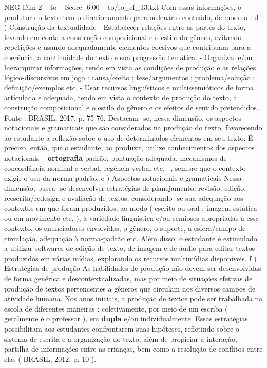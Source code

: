 \begin{textsample}{NEG Dim 2 – to – Score -6.00 – to/to\_ef\_13.txt}
Com essas informações, o produtor do texto tem o direcionamento para ordenar o conteúdo, de modo a : d ) Construção da textualidade - Estabelecer relações entre as partes do texto, levando em conta a construção composicional e o estilo do gênero, evitando repetições e usando adequadamente elementos coesivos que contribuam para a coerência, a continuidade do texto e sua progressão temática. - Organizar e/ou hierarquizar informações, tendo em vista as condições de produção e as relações lógico-discursivas em jogo : causa/efeito ; tese/argumentos ; problema/solução ; definição/exemplos etc. - Usar recursos linguísticos e multissemióticos de forma articulada e adequada, tendo em vista o contexto de produção do texto, a construção composicional e o estilo do gênero e os efeitos de sentido pretendidos.
Fonte : BRASIL, 2017, p. 75-76.
Destacam -se, nessa dimensão, os aspectos notacionais e gramaticais que são considerados na produção do texto, favorecendo ao estudante a reflexão sobre o uso de determinados elementos em seu texto.
É preciso, então, que o estudante, ao produzir, utilize conhecimentos dos aspectos notacionais – \textbf{ortografia} padrão, pontuação adequada, mecanismos de concordância nominal e verbal, regência verbal etc. –, sempre que o contexto exigir o uso da norma-padrão. e ) Aspectos notacionais e gramaticais Nessa dimensão, busca -se desenvolver estratégias de planejamento, revisão, edição, reescrita/redesign e avaliação de textos, considerando -se sua adequação aos contextos em que foram produzidos, ao modo ( escrito ou oral ; imagem estática ou em movimento etc. ), à variedade linguística e/ou semioses apropriadas a esse contexto, os enunciadores envolvidos, o gênero, o suporte, a esfera/campo de circulação, adequação à norma-padrão etc.
Além disso, o estudante é estimulado a utilizar softwares de edição de texto, de imagem e de áudio para editar textos produzidos em várias mídias, explorando os recursos multimídias disponíveis. f ) Estratégias de produção As habilidades de produção não devem ser desenvolvidas de forma genérica e descontextualizadas, mas por meio de situações efetivas de produção de textos pertencentes a gêneros que circulam nos diversos campos de atividade humana.
Nos anos iniciais, a produção de textos pode ser trabalhada na escola de diferentes maneiras : coletivamente, por meio de um escriba ( geralmente é o professor ), em \textbf{dupla} e/ou individualmente.
Essas estratégias possibilitam aos estudantes confrontarem suas hipóteses, refletindo sobre o sistema de escrita e a organização do texto, além de propiciar a interação, partilha de informações entre as crianças, bem como a resolução de conflitos entre elas ( BRASIL, 2012, p. 10 ).

\end{textsample}
